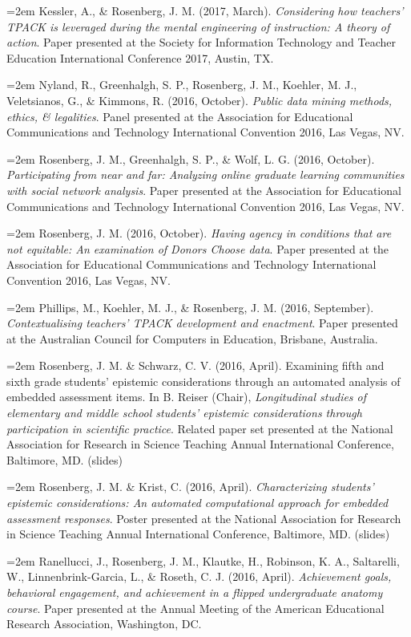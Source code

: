 \documentclass[
  14,
]{article}
\begin{document}
\hangindent=2em Kessler, A., \& Rosenberg, J. M. (2017, March).
\emph{Considering how teachers' TPACK is leveraged during the mental
engineering of instruction: A theory of action}. Paper presented at the
Society for Information Technology and Teacher Education International
Conference 2017, Austin, TX.

\hangindent=2em Nyland, R., Greenhalgh, S. P., Rosenberg, J. M.,
Koehler, M. J., Veletsianos, G., \& Kimmons, R. (2016, October).
\emph{Public data mining methods, ethics, \& legalities}. Panel
presented at the Association for Educational Communications and
Technology International Convention 2016, Las Vegas, NV.

\hangindent=2em Rosenberg, J. M., Greenhalgh, S. P., \& Wolf, L. G.
(2016, October). \emph{Participating from near and far: Analyzing online
graduate learning communities with social network analysis}. Paper
presented at the Association for Educational Communications and
Technology International Convention 2016, Las Vegas, NV.

\hangindent=2em Rosenberg, J. M. (2016, October). \emph{Having agency in
conditions that are not equitable: An examination of Donors Choose
data}. Paper presented at the Association for Educational Communications
and Technology International Convention 2016, Las Vegas, NV.

\hangindent=2em Phillips, M., Koehler, M. J., \& Rosenberg, J. M. (2016,
September). \emph{Contextualising teachers' TPACK development and
enactment}. Paper presented at the Australian Council for Computers in
Education, Brisbane, Australia.

\hangindent=2em Rosenberg, J. M. \& Schwarz, C. V. (2016, April).
Examining fifth and sixth grade students' epistemic considerations
through an automated analysis of embedded assessment items. In B. Reiser
(Chair), \emph{Longitudinal studies of elementary and middle school
students' epistemic considerations through participation in scientific
practice}. Related paper set presented at the National Association for
Research in Science Teaching Annual International Conference, Baltimore,
MD. (slides)

\hangindent=2em Rosenberg, J. M. \& Krist, C. (2016, April).
\emph{Characterizing students' epistemic considerations: An automated
computational approach for embedded assessment responses}. Poster
presented at the National Association for Research in Science Teaching
Annual International Conference, Baltimore, MD. (slides)

\hangindent=2em Ranellucci, J., Rosenberg, J. M., Klautke, H., Robinson,
K. A., Saltarelli, W., Linnenbrink-Garcia, L., \& Roseth, C. J. (2016,
April). \emph{Achievement goals, behavioral engagement, and achievement
in a flipped undergraduate anatomy course}. Paper presented at the
Annual Meeting of the American Educational Research Association,
Washington, DC.
\end{document}
